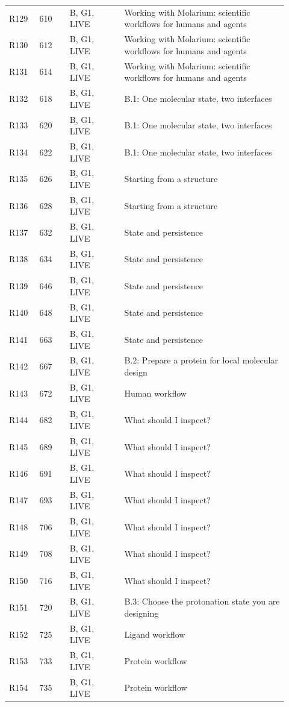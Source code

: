 \documentclass[11pt]{article}
\begin{document}
\begin{longtable}{@{}p{0.10\linewidth}p{0.10\linewidth}p{0.18\linewidth}p{0.54\linewidth}@{}}
R129 & 610 & B, G1, LIVE & Working with Molarium: scientific workflows for humans and agents \\
R130 & 612 & B, G1, LIVE & Working with Molarium: scientific workflows for humans and agents \\
R131 & 614 & B, G1, LIVE & Working with Molarium: scientific workflows for humans and agents \\
R132 & 618 & B, G1, LIVE & B.1: One molecular state, two interfaces \\
R133 & 620 & B, G1, LIVE & B.1: One molecular state, two interfaces \\
R134 & 622 & B, G1, LIVE & B.1: One molecular state, two interfaces \\
R135 & 626 & B, G1, LIVE & Starting from a structure \\
R136 & 628 & B, G1, LIVE & Starting from a structure \\
R137 & 632 & B, G1, LIVE & State and persistence \\
R138 & 634 & B, G1, LIVE & State and persistence \\
R139 & 646 & B, G1, LIVE & State and persistence \\
R140 & 648 & B, G1, LIVE & State and persistence \\
R141 & 663 & B, G1, LIVE & State and persistence \\
R142 & 667 & B, G1, LIVE & B.2: Prepare a protein for local molecular design \\
R143 & 672 & B, G1, LIVE & Human workflow \\
R144 & 682 & B, G1, LIVE & What should I inspect? \\
R145 & 689 & B, G1, LIVE & What should I inspect? \\
R146 & 691 & B, G1, LIVE & What should I inspect? \\
R147 & 693 & B, G1, LIVE & What should I inspect? \\
R148 & 706 & B, G1, LIVE & What should I inspect? \\
R149 & 708 & B, G1, LIVE & What should I inspect? \\
R150 & 716 & B, G1, LIVE & What should I inspect? \\
R151 & 720 & B, G1, LIVE & B.3: Choose the protonation state you are designing \\
R152 & 725 & B, G1, LIVE & Ligand workflow \\
R153 & 733 & B, G1, LIVE & Protein workflow \\
R154 & 735 & B, G1, LIVE & Protein workflow \\

\end{longtable}
\end{document}
